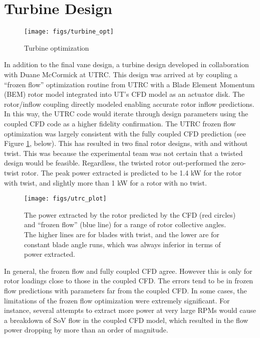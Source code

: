 \section{Turbine Design}

  \begin{figure}[!htb]
   \begin{center}
    \texttt{[image: figs/turbine\_opt]}
    \caption{Turbine optimization}
    \label{fig:ut_turbine}
   \end{center}
  \end{figure}

In addition to the final vane design, a turbine design developed in
collaboration with Duane McCormick at UTRC. This design was arrived at
by coupling a ``frozen flow'' optimization routine from UTRC with a Blade
Element Momentum (BEM) rotor model integrated into UT's CFD model as an
actuator disk. The rotor/inflow coupling directly modeled enabling
accurate rotor inflow predictions. In this way, the UTRC code would
iterate through design parameters using the coupled CFD code as a higher
fidelity confirmation. The UTRC frozen flow optimization was largely
consistent with the fully coupled CFD prediction (see Figure \ref{},
below). This has resulted in two final rotor designs, with and without
twist. This was because the experimental team was not certain that a
twisted design would be feasible. Regardless, the twisted rotor
out-performed the zero-twist rotor. The peak power extracted is
predicted to be 1.4 kW for the rotor with twist, and slightly more than
1 kW for a rotor with no twist. 

  \begin{figure}[!htb]
   \begin{center}
    \texttt{[image: figs/utrc\_plot]}
    \caption{The power extracted by the rotor predicted by the CFD (red
    circles) and ``frozen flow'' (blue line) for a range of rotor
    collective angles. The higher lines are for blades with twist, and
    the lower are for constant blade angle runs, which was always
    inferior in terms of power extracted.}
    \label{fig:UTRC_turbine}
   \end{center}
  \end{figure}


In general, the frozen flow and fully coupled CFD agree. However this is
only for rotor loadings close to those in the coupled CFD. The errors
tend to be in frozen flow predictions with parameters far from the
coupled CFD. In some cases, the limitations of the frozen flow
optimization were extremely significant. For instance, several attempts
to extract more power at very large RPMs would cause a breakdown of SoV
flow in the coupled CFD model, which resulted in the flow power dropping
by more than an order of magnitude.

